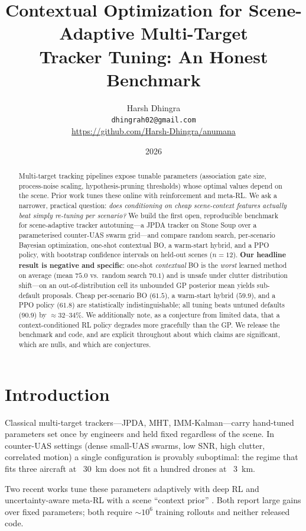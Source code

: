 \documentclass[11pt]{article}
\title{Contextual Optimization for Scene-Adaptive Multi-Target\\
Tracker Tuning: An Honest Benchmark}
\author{Harsh Dhingra\\
\texttt{dhingrah02@gmail.com}\\
\small\url{https://github.com/Harsh-Dhingra/anumana}}
\date{2026}
\begin{document}
\maketitle

\begin{abstract}
Multi-target tracking pipelines expose tunable parameters (association
gate size, process-noise scaling, hypothesis-pruning thresholds) whose
optimal values depend on the scene. Prior work
\citep{stephan2022,ott2022} tunes these online with reinforcement and
meta-RL. We ask a narrower, practical question: \emph{does conditioning
on cheap scene-context features actually beat simply re-tuning per
scenario?} We build the first open, reproducible benchmark for
scene-adaptive tracker autotuning---a JPDA tracker on Stone Soup over a
parameterised counter-UAS swarm grid---and compare random search,
per-scenario Bayesian optimization, one-shot contextual BO, a warm-start
hybrid, and a PPO policy, with bootstrap confidence intervals on
held-out scenes ($n{=}12$). \textbf{Our headline result is negative and
specific}: one-shot \emph{contextual} BO is the \emph{worst} learned
method on average (mean $75.0$ vs.\ random search $70.1$) and is unsafe
under clutter distribution shift---on an out-of-distribution cell its
unbounded GP posterior mean yields sub-default proposals. Cheap
per-scenario BO ($61.5$), a warm-start hybrid ($59.9$), and a PPO policy
($61.8$) are statistically indistinguishable; all tuning beats untuned
defaults ($90.9$) by ${\approx}32\text{--}34\%$. We additionally note,
as a conjecture from limited data, that a context-conditioned RL policy
degrades more gracefully than the GP. We release the benchmark and code,
and are explicit throughout about which claims are significant, which
are nulls, and which are conjectures.
\end{abstract}

\section{Introduction}

Classical multi-target trackers---JPDA, MHT, IMM-Kalman---carry
hand-tuned parameters set once by engineers and held fixed regardless of
the scene. In counter-UAS settings (dense small-UAS swarms, low SNR,
high clutter, correlated motion) a single configuration is provably
suboptimal: the regime that fits three aircraft at \SI{}{30~km} does not
fit a hundred drones at \SI{}{3~km}.

Two recent works tune these parameters adaptively with deep RL
\citep{stephan2022} and uncertainty-aware meta-RL with a scene
``context prior'' \citep{ott2022}. Both report large gains over fixed
parameters; both require ${\sim}10^6$ training rollouts and neither
released code.
\end{document}
